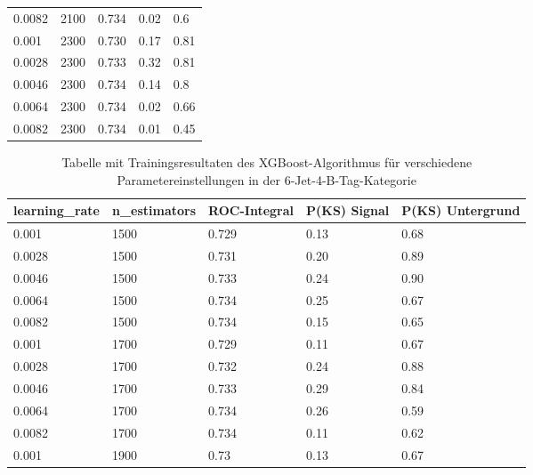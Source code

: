 \begin{table}[hhh]
\begin{center}
\begin{tabular}{lllll}
\num{0,0082} & \num{2100} & \num{0,734} & \num{0,02} & \num{0,6}\\
\num{0,001}  & \num{2300} & \num{0,730} & \num{0,17} & \num{0,81}\\
\num{0,0028} & \num{2300} & \num{0,733} & \num{0,32} & \num{0,81}\\
\num{0,0046} & \num{2300} & \num{0,734} & \num{0,14} & \num{0,8}\\
\num{0,0064} & \num{2300} & \num{0,734} & \num{0,02} & \num{0,66}\\
\num{0,0082} & \num{2300} & \num{0,734} & \num{0,01} & \num{0,45}\\
  \hline
  \end{tabular}
  \end{center}
\end{table}

\begin{table}[tbp]\parbox{12cm}{
\renewcommand\thetable{A.2}
  \caption[XGBoost 6j4t Ergebnisse]{Tabelle mit Trainingsresultaten des XGBoost-Algorithmus f\"ur verschiedene Parametereinstellungen in der 6-Jet-4-B-Tag-Kategorie}%
  }\label{tab:xgboost_6j4t}
  \begin{center}
  \begin{tabular}{lllll}
  \hline
  learning\_rate & n\_estimators & ROC-Integral & P(KS) Signal & P(KS) Untergrund\\
  \hline
\num{0,001}  & \num{1500} & \num{0,729} & \num{0,13} & \num{0,68}\\
\num{0,0028} & \num{1500} & \num{0,731} & \num{0,20} & \num{0,89}\\
\num{0,0046} & \num{1500} & \num{0,733} & \num{0,24} & \num{0,90}\\
\num{0,0064} & \num{1500} & \num{0,734} & \num{0,25} & \num{0,67}\\
\num{0,0082} & \num{1500} & \num{0,734} & \num{0,15} & \num{0,65}\\
\num{0,001}  & \num{1700} & \num{0,729} & \num{0,11} & \num{0,67}\\
\num{0,0028} & \num{1700} & \num{0,732} & \num{0,24} & \num{0,88}\\
\num{0,0046} & \num{1700} & \num{0,733} & \num{0,29} & \num{0,84}\\
\num{0,0064} & \num{1700} & \num{0,734} & \num{0,26} & \num{0,59}\\
\num{0,0082} & \num{1700} & \num{0,734} & \num{0,11} & \num{0,62}\\
\num{0,001}  & \num{1900} & \num{0,73}  & \num{0,13} & \num{0,67}\\

\end{tabular}
\end{center}
\end{table}
